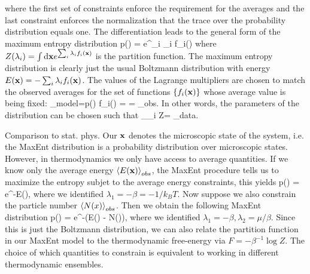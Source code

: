 where the first set of constraints enforce the requirement for the averages and the last constraint enforces the normalization that the trace over the probability distribution equals one. The differentiation leads to the general form of the maximum entropy distribution
\be 
p(\mx) =  e^{\sum_i \lambda_i f_i(\mx)}
\ee 
where $Z(\lambda_i)= \int \mathrm{d} \mathbf{x} e^{\sum_i \lambda_i f_i(\mathbf{x})}$ is the partition function. The maximum entropy distribution is clearly just the usual Boltzmann distribution with energy $E(\mathbf{x}) = - \sum_i \lambda_i f_i(\mathbf{x})$. The values of the Lagrange multipliers are chosen to match the observed averages for the set of functions $\{f_i(\mathbf{x})\}$ whose average value is being fixed:
\bse 
{}_{model}=\int \md \mx p(\mx) f_i(\mx) =  = _{obs}.
\ese 
In other words, the parameters of the distribution can be chosen such that 
\bse 
\partial_{\lambda_i} \log Z= _{data}.
\ese 
\begin{mybox}{Comparison to stat. phys.}
	Our $\mathbf{x}$ denotes the microscopic state of the system, i.e. the MaxEnt distribution is a probability distribution over microscopic states. However, in thermodynamics we only have access to average quantities. If we know only the average energy $\expval{E(\mathbf{x})}_{obs}$, the MaxEnt procedure tells us to maximize the entropy subjet to the average energy constraints, this yields
	\be 
	p(\mx) =  e^{-\beta E(\mx)},
	\ee 
	where we identified $\lambda_1 = - \beta= -1/k_BT$. Now suppose we also constrain the particle number $\expval{N(x)}_{obs}$. Then we obtain the following MaxEnt distribution
	\be 
	p(\mx) =  e^{-\beta (E(\mx) - \mu N(\mx))},
	\ee 
	where we identified $\lambda_1=-\beta, \lambda_2=\mu/\beta$. Since this is just the Boltzmann distribution, we can also relate the partition function in our MaxEnt model to the thermodynamic free-energy via $F=-\beta^{-1} \log Z$. The choice of which quantities to constrain is equivalent to working in different thermodynamic ensembles.
\end{mybox}
